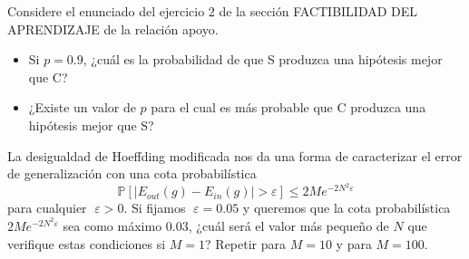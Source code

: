 \documentclass[a4paper, 11pt]{article}
\begin{document}
    \begin{ejercicio}
        Considere el enunciado del ejercicio 2 de la sección FACTIBILIDAD DEL APRENDIZAJE de la relación apoyo.
        \begin{itemize}
            \item Si $p = 0.9$, ¿cuál es la probabilidad de que S produzca una hipótesis mejor que C?
            \item ¿Existe un valor de $p$ para el cual es más probable que C produzca una hipótesis mejor que S?
        \end{itemize}
    \end{ejercicio}


    \begin{ejercicio}
        La desigualdad de Hoeffding modificada nos da una forma de caracterizar el error de generalización con una cota probabilística
        \[
        \mathbb{P}[\vert E_{out}(g) - E_{in}(g) \vert > \varepsilon] \leq 2 M e^{-2 N^2 \varepsilon}
        \]
        para cualquier $\varepsilon > 0$. Si fijamos $\varepsilon = 0.05$ y queremos que la cota probabilística $2 M e^{-2 N^2 \varepsilon}$ sea como máximo $0.03$, ¿cuál será el valor más pequeño de $N$ que verifique estas condiciones si $M = 1$? Repetir para $M = 10$ y para $M = 100$.
    \end{ejercicio}
\end{document}
